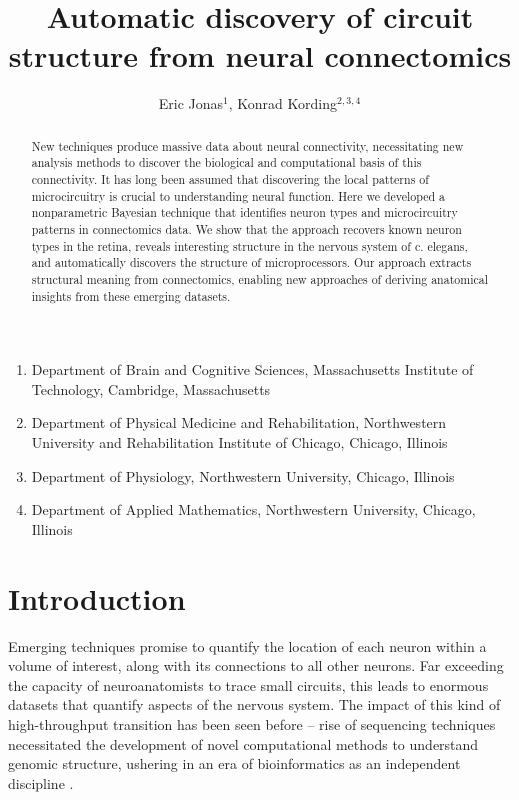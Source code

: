\documentclass{article}
\title{Automatic discovery of circuit structure from neural connectomics}
\author{Eric Jonas$^1$, Konrad Kording$^{2, 3,4}$}
\begin{document}
\maketitle

\begin{small}
\begin{enumerate}
  \item Department of Brain and Cognitive Sciences, Massachusetts Institute of Technology, Cambridge, Massachusetts
  \item Department of Physical Medicine and Rehabilitation, Northwestern University and Rehabilitation Institute of Chicago, Chicago, Illinois
  \item Department of Physiology, Northwestern University, Chicago, Illinois
  \item Department of Applied Mathematics, Northwestern University, Chicago, Illinois
\end{enumerate}
\end{small}

\begin{abstract}
  New techniques produce massive data about neural connectivity,
  necessitating new analysis methods to discover the biological and
  computational basis of this connectivity. It has long been assumed
  that discovering the local patterns of microcircuitry is crucial to
  understanding neural function. Here we developed a nonparametric
  Bayesian technique that identifies neuron types and microcircuitry
  patterns in connectomics data. We show that the approach recovers
  known neuron types in the retina, reveals interesting structure in
  the nervous system of c. elegans, and automatically discovers the
  structure of microprocessors. Our approach extracts structural
  meaning from connectomics, enabling new approaches of deriving
  anatomical insights from these emerging datasets.


\end{abstract}

\section*{Introduction}
Emerging techniques \autocite{Morgan2013,Zador2012} promise to
quantify the location of each neuron within a volume of interest,
along with its connections to all other neurons. Far exceeding the
capacity of neuroanatomists to trace small circuits, this leads to
enormous datasets that quantify aspects of the nervous system. The impact of
this kind of high-throughput transition has been seen before -- 
rise of sequencing techniques necessitated the
development of novel computational methods to understand genomic
structure, ushering in an era of bioinformatics as an independent
discipline \autocite{Koboldt2013}.
\end{document}
